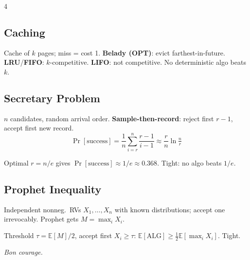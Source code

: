 \documentclass[8pt,a4paper,landscape]{extarticle}
\begin{document}
\begin{multicols*}{4}
\subsection{Caching}
Cache of $k$ pages; miss = cost 1. \textbf{Belady (OPT)}: evict farthest-in-future. \textbf{LRU}/\textbf{FIFO}: $k$-competitive. \textbf{LIFO}: not competitive. No deterministic algo beats $k$.

\subsection{Secretary Problem}
$n$ candidates, random arrival order. \textbf{Sample-then-record}: reject first $r{-}1$, accept first new record.
\[ \Pr[\text{success}] = \frac{1}{n}\sum_{i=r}^{n}\frac{r-1}{i-1} \approx \frac{r}{n}\ln\!\tfrac{n}{r} \]
\begin{thm}
Optimal $r=n/e$ gives $\Pr[\text{success}]\approx 1/e\approx 0.368$. Tight: no algo beats $1/e$.
\end{thm}

\subsection{Prophet Inequality}
Independent nonneg.\ RVs $X_1,\ldots,X_n$ with known distributions; accept one irrevocably. Prophet gets $M=\max_i X_i$.
\begin{thm}
Threshold $\tau=\mathbb{E}[M]/2$, accept first $X_i\geq\tau$:
$\mathbb{E}[\text{ALG}]\geq\tfrac{1}{2}\mathbb{E}[\max_i X_i]$. Tight.
\end{thm}

\vfill
\begin{center}
\textit{Bon courage.}
\end{center}

\end{multicols*}
\end{document}
